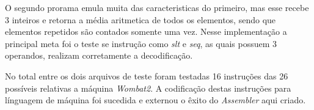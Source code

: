 \documentclass{article}
\begin{document}
O segundo prorama emula muita das caracteristicas do primeiro, mas esse recebe 3 inteiros e retorna a média aritmetica de todos os elementos, sendo que elementos repetidos são contados somente uma vez. Nesse implementação a principal meta foi o teste se instrução como \textit{slt} e \textit{seq}, as quais possuem 3 operandos, realizam corretamente a decodificação.

No total entre os dois arquivos de teste foram testadas 16 instruções das 26 possíveis relativas a máquina \textit{Wombat2}. A codificação destas instruções para línguagem de máquina foi sucedida e externou o êxito do \textit{Assembler} aqui criado.

\subsection{}



\end{document}
